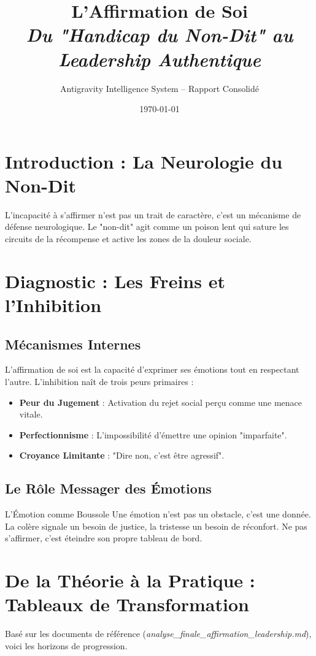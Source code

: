 \documentclass[11.5pt,a4paper]{article}
\title{
    \Huge \textbf{L'Affirmation de Soi} \\
    \Large \textit{Du "Handicap du Non-Dit" au Leadership Authentique}
}
\author{Antigravity Intelligence System -- Rapport Consolidé}
\date{\today}
\begin{document}
\maketitle
\tableofcontents
\newpage

\section{Introduction : La Neurologie du Non-Dit}
L'incapacité à s'affirmer n'est pas un trait de caractère, c'est un mécanisme de défense neurologique. Le "non-dit" agit comme un poison lent qui sature les circuits de la récompense et active les zones de la douleur sociale.

\section{Diagnostic : Les Freins et l'Inhibition}
\subsection{Mécanismes Internes}
L'affirmation de soi est la capacité d'exprimer ses émotions tout en respectant l'autre. L'inhibition naît de trois peurs primaires :
\begin{itemize}
    \item \textbf{Peur du Jugement} : Activation du rejet social perçu comme une menace vitale.
    \item \textbf{Perfectionnisme} : L'impossibilité d'émettre une opinion "imparfaite".
    \item \textbf{Croyance Limitante} : "Dire non, c'est être agressif".
\end{itemize}

\subsection{Le Rôle Messager des Émotions}
\begin{ConceptCle}{L'Émotion comme Boussole}
Une émotion n'est pas un obstacle, c'est une donnée. La colère signale un besoin de justice, la tristesse un besoin de réconfort. Ne pas s'affirmer, c'est éteindre son propre tableau de bord.
\end{ConceptCle}

\section{De la Théorie à la Pratique : Tableaux de Transformation}
Basé sur les documents de référence (\textit{analyse\_finale\_affirmation\_leadership.md}), voici les horizons de progression.
\end{document}
